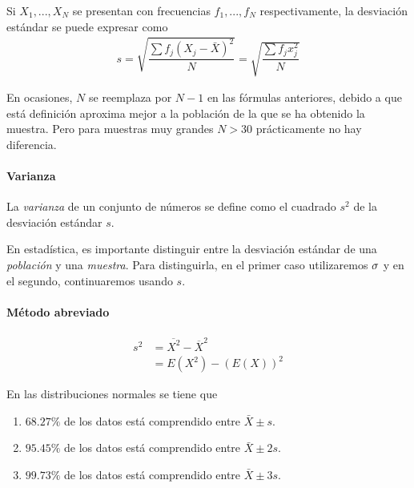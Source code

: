 Si $X_{1},...,X_{N}$ se presentan con frecuencias $f_{1},...,f_{N}$ respectivamente, la desviación estándar se puede expresar como
\begin{align}
	s=\sqrt{\dfrac{\sum f_{j}\left( X_{j}-\bar{X} \right)^{2}}{N}}=\sqrt{\dfrac{\sum f_{j}x_{j}^{2}}{N}}
\end{align}


\begin{observacion}
	En ocasiones, $N$ se reemplaza por $N-1$ en las fórmulas anteriores, debido a que está definición aproxima mejor a la población de la que se ha obtenido la muestra. Pero para muestras muy grandes $N>30$ prácticamente no hay diferencia.
\end{observacion}


\paragraph{Varianza}
La \emph{varianza} de un conjunto de números se define como el cuadrado $s^{2}$ de la desviación estándar $s$.


\begin{observacion}
	En estadística, es importante distinguir entre la desviación estándar de una \emph{población} y una \emph{muestra}. Para distinguirla, en el primer caso utilizaremos $\sigma$ y en el segundo, continuaremos usando $s.$
\end{observacion}


\paragraph{Método abreviado}
\begin{align}
	s^{2}&=\overline{X^{2}}-\overline{X}^{2} \\
	&= E(X^2)-\left( E(X) \right)^{2}
\end{align}



En las distribuciones normales se tiene que
\begin{enumerate}
	\item $68.27\%$ de los datos está comprendido entre $\bar{X}\pm s.$
	\item $95.45\%$ de los datos está comprendido entre $\bar{X}\pm 2s.$
	\item $99.73\%$ de los datos está comprendido entre $\bar{X}\pm 3s.$
	
\end{enumerate}



